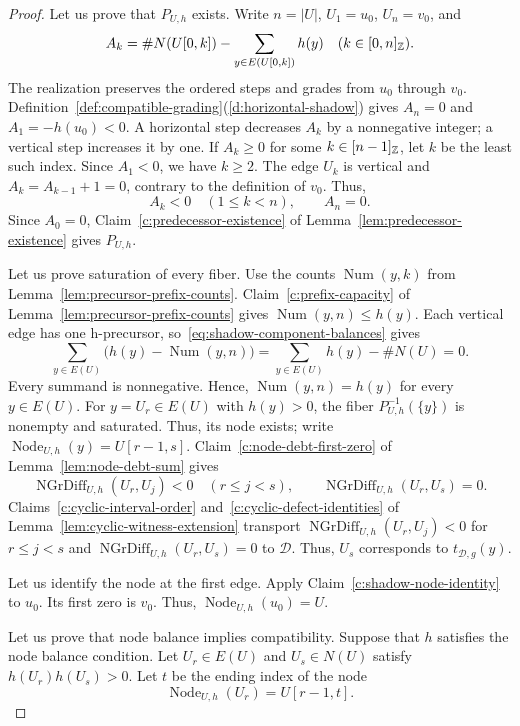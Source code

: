 \begin{proof}
 Let us prove that $P_{U,h}$ exists.
Write $n=|U|$, $U_1=u_0$, $U_n=v_0$, and
\[
 A_k=\#N(U[0,k])-\sum_{y\in E(U[0,k])}h(y)\quad(k\in[0,n]_{\mathbb Z}).
\]
The realization preserves the ordered steps and grades from $u_0$ through $v_0$.
Definition~\ref{def:compatible-grading}(\ref{d:horizontal-shadow}) gives $A_n=0$ and $A_1=-h(u_0)<0$.
A horizontal step decreases $A_k$ by a nonnegative integer;
a vertical step increases it by one.
If $A_k\ge0$ for some $k\in[n-1]_{\mathbb Z}$, let $k$ be the least such index.
Since $A_1<0$, we have $k\ge2$.
The edge $U_k$ is vertical and $A_k=A_{k-1}+1=0$, contrary to the definition of $v_0$.
Thus, \begin{equation}\label{eq:shadow-component-balances}
 A_k<0\quad(1\le k<n),\qquad A_n=0.
\end{equation}
Since $A_0=0$, Claim~\ref{c:predecessor-existence} of
Lemma~\ref{lem:predecessor-existence} gives $P_{U,h}$.

 Let us prove saturation of every fiber.
Use the counts $\operatorname{Num}(y,k)$ from Lemma~\ref{lem:precursor-prefix-counts}.
Claim~\ref{c:prefix-capacity} of Lemma~\ref{lem:precursor-prefix-counts} gives $\operatorname{Num}(y,n)\le h(y)$.
Each vertical edge has one h-precursor, so~\eqref{eq:shadow-component-balances} gives
\[
 \sum_{y\in E(U)}\bigl(h(y)-\operatorname{Num}(y,n)\bigr)
 =\sum_{y\in E(U)}h(y)-\#N(U)=0.
\]
Every summand is nonnegative. Hence, $\operatorname{Num}(y,n)=h(y)$ for every $y\in E(U)$.
For $y=U_r\in E(U)$ with $h(y)>0$, the fiber $P_{U,h}^{-1}(\{y\})$ is nonempty and saturated. Thus, its node exists; write $\operatorname{Node}_{U,h}(y)=U[r-1,s]$.
Claim~\ref{c:node-debt-first-zero} of Lemma~\ref{lem:node-debt-sum} gives
\[
 \operatorname{NGrDiff}_{U,h}(U_r,U_j)<0\quad(r\le j<s),\qquad
 \operatorname{NGrDiff}_{U,h}(U_r,U_s)=0.
\]
Claims~\ref{c:cyclic-interval-order} and~\ref{c:cyclic-defect-identities} of Lemma~\ref{lem:cyclic-witness-extension} transport $\operatorname{NGrDiff}_{U,h}(U_r,U_j)<0$ for $r\le j<s$ and $\operatorname{NGrDiff}_{U,h}(U_r,U_s)=0$ to $\mathcal D$.
Thus, $U_s$ corresponds to $t_{\mathcal D,g}(y)$.

 Let us identify the node at the first edge.
Apply Claim~\ref{c:shadow-node-identity} to $u_0$.
Its first zero is $v_0$. Thus, $\operatorname{Node}_{U,h}(u_0)=U$.

 Let us prove that node balance implies compatibility.
Suppose that $h$ satisfies the node balance condition.
Let $U_r\in E(U)$ and $U_s\in N(U)$ satisfy $h(U_r)h(U_s)>0$.
Let $t$ be the ending index of the node
\[
 \operatorname{Node}_{U,h}(U_r)=U[r-1,t].
\]


\end{proof}
